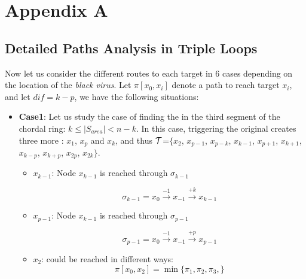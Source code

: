 
\newpage
\appendix
\section{Appendix A} \label{AppendixA}

\subsection{Detailed Paths Analysis in Triple Loops} 

Now let us consider the different routes to each target in $6$ cases depending on the location of the {\it black virus}.  Let $\pi[x_0,x_{i}] $ denote a path to reach target $x_i$, and let $dif=k-p$, we have the following situations:
\begin{itemize}
\item {\bf Case1}: Let us study the case of finding the \bv in the third segment of the chordal ring: $k\leq |S_{area}| <n-k$. In this case, triggering the original \bv creates three more \bvs: $x_{1}$, $x_{p}$ and $x_{k}$, and thus $\cal T$=$\{x_{2}$, $x_{p-1}$, $x_{p-k}$, $x_{k-1}$, $x_{p+1}$, $x_{k+1}$, $x_{k-p}$, $x_{k+p}$,  $x_{2p}$, $x_{2k}\}$. 
\begin{itemize}

\item  $x_{k-1}$:  Node  $x_{k-1}$ is reached through  $\sigma_{k-1}$
 
$$ \sigma_{k-1} =  x_{0}\xrightarrow {-1}x_{-1}\xrightarrow {+k}x_{k-1}$$


\item  $x_{p-1}$:  Node  $x_{k-1}$ is reached through $\sigma_{p-1}$
 
$$ \sigma_{p-1} =  x_{0}\xrightarrow {-1}x_{-1}\xrightarrow {+p}x_{p-1}$$


\item $x_{2}$:  could be reached in different ways:\\
$$ \pi[x_0,x_{2}] = \min \{ \pi_1, \pi_2,  \pi_3,\}$$


 \begin{itemize} 
 

\end{itemize}
\end{itemize}
\end{itemize}
